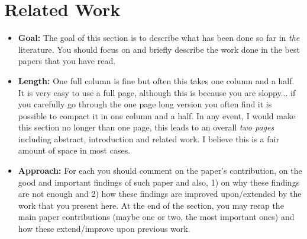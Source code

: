 
\section{Related Work}
\label{sec:related_work}

\begin{itemize}
\item \textbf{Goal:} The goal of this section is to describe what has been done so far in {\it the} literature. You should focus on and briefly describe the work done in the best papers that you have read. 
\item \textbf{Length:} One full column is fine but often this takes one column and a half. It is very easy to use a full page, although this is because you are sloppy... if you carefully go through the one page long version you often find it is possible to compact it in one column and a half. In any event, I would make this section no longer than one page, this leads to an overall {\it two pages} including abstract, introduction and related work. I believe this is a fair amount of space in most cases.
\item \textbf{Approach:} For each you should comment on the paper's contribution, on the good and important findings of such paper and also, 1) on why these findings are not enough and 2) how these findings are improved upon/extended by the work that you present here. At the end of the section, you may recap the main paper contributions (maybe one or two, the most important ones) and how these extend/improve upon previous work.
\end{itemize}
